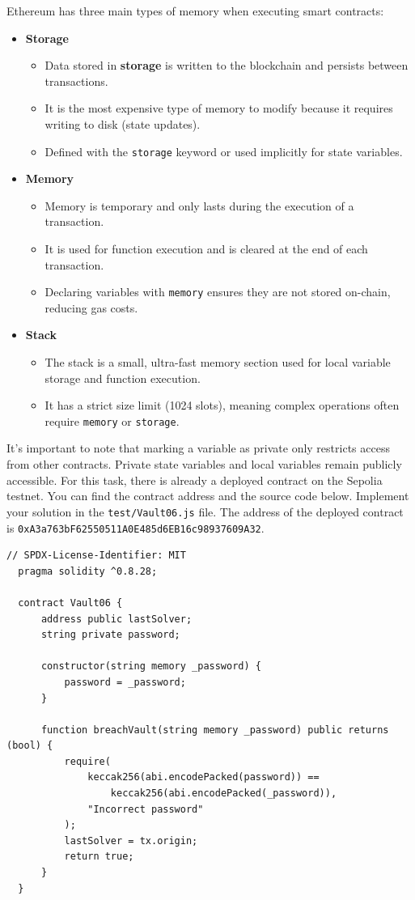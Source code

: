 \documentclass[12pt]{article}
\begin{document}
Ethereum has three main types of memory when executing smart contracts:
\begin{itemize}
  \item \textbf{Storage} 
  \begin{itemize}
      \item Data stored in \textbf{storage} is written to the blockchain and persists between transactions.
      \item It is the most expensive type of memory to modify because it requires writing to disk (state updates).
      \item Defined with the \texttt{storage} keyword or used implicitly for state variables.
  \end{itemize}

  \item \textbf{Memory}
  \begin{itemize}
      \item Memory is temporary and only lasts during the execution of a transaction.
      \item It is used for function execution and is cleared at the end of each transaction.
      \item Declaring variables with \texttt{memory} ensures they are not stored on-chain, reducing gas costs.
  \end{itemize}

  \item \textbf{Stack}
  \begin{itemize}
      \item The stack is a small, ultra-fast memory section used for local variable storage and function execution.
      \item It has a strict size limit (1024 slots), meaning complex operations often require \texttt{memory} or \texttt{storage}.
  \end{itemize}
\end{itemize}

\noindent
It's important to note that marking a variable as private only restricts access from other contracts. Private state variables and local variables remain publicly accessible. For this task, there is already a deployed contract on the Sepolia testnet. You can find the contract address and the source code below. Implement your solution in the \texttt{test/Vault06.js} file. The address of the deployed contract is \texttt{0xA3a763bF62550511A0E485d6EB16c98937609A32}.

\begin{lstlisting}[language=Solidity]
  // SPDX-License-Identifier: MIT
  pragma solidity ^0.8.28;
  
  contract Vault06 {
      address public lastSolver;
      string private password;
  
      constructor(string memory _password) {
          password = _password;
      }
  
      function breachVault(string memory _password) public returns (bool) {
          require(
              keccak256(abi.encodePacked(password)) ==
                  keccak256(abi.encodePacked(_password)),
              "Incorrect password"
          );
          lastSolver = tx.origin;
          return true;
      }
  }
\end{lstlisting}
\end{document}

